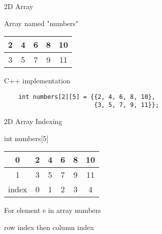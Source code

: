 \documentclass[xcolor={dvipsnames}]{beamer}
\begin{document}
\begin{frame}[fragile]{2D Array}
	\begin{block}{Array named "numbers"}
	\begin{table}
	\Huge
	\begin{tabular}{|c|c|c|c|c|}
	\hline
	2  & 4 & 6 & 8 & 10\\
	\hline
	3  & 5 & 7 & 9 & 11\\
	\hline
	\end{tabular}
	\end{table}
	\end{block}
	\pause
	\begin{block}{C++ implementation}
	\begin{verbatim}
	int numbers[2][5] = {{2, 4, 6, 8, 10},
	                     {3, 5, 7, 9, 11}};
	\end{verbatim}
	\end{block}
\end{frame}

\begin{frame}{2D Array Indexing}
	\begin{block}{int numbers[5]}
	\begin{table}
	\Huge
	\begin{tabular}{|c|c|c|c|c|c|}
	\hline
	 {\color{red} 0} & 2  & 4 & 6 & 8 & 10\\
	\hline
	 {\color{red} 1}  & 3  & 5 & 7 & 9 & 11\\
	\hline
	{\color{red}index} &  {\color{red} 0}   &  {\color{red} 1}  &   {\color{red} 2}  &  {\color{red} 3}  &  {\color{red} 4} \\
	\hline
	\end{tabular}
	\end{table}
	\end{block}
	\pause
	\begin{block}{For element e in array numbers}
		\begin{center}
		row index then column index
		\end{center}
	\end{block}
\end{frame}
\end{document}
